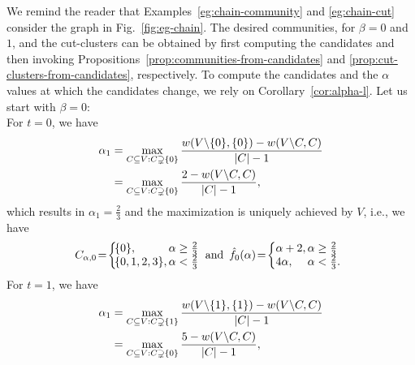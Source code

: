 We remind the reader that Examples~\ref{eg:chain-community} and \ref{eg:chain-cut} consider the graph in Fig.~\ref{fig:eg-chain}.
The desired communities, for $\beta = 0$ and $1$, and the cut-clusters can be obtained by first computing the
candidates and then invoking Propositions~\ref{prop:communities-from-candidates}
and \ref{prop:cut-clusters-from-candidates}, respectively.
To compute the candidates and the $\alpha$ values at which the candidates change, we rely on
Corollary~\ref{cor:alpha-l}.
Let us start with $\beta = 0$:
\\
For $t = 0$, we have
\begin{align*}
	\alpha_1
		&=
		\max_{C\subseteq V:C\supsetneq \{0\}} \frac{w(V\backslash \{0\},\{0\}) - w(V\backslash C,C)}{|C|-1} \\
		& = 
		\max_{C\subseteq V:C\supsetneq \{0\}} \frac{2 - w(V\backslash C,C)}{|C|-1},
\end{align*}
which results in $\alpha_1 = \frac{2}{3}$ and the maximization is uniquely achieved by $V$, i.e., we
have
\begin{align*}
	\begin{array}{lll}
	C_{\alpha,0} \! = \! \left\{
	\!\!
		\begin{array}{ll}
		\!\!
			\Set{0}, \!\! & \!\!\! \alpha \geq  \frac{2}{3}
			\\
			\!\!
			\Set{0,1,2,3}, \!\! & \!\!\! \alpha < \frac{2}{3}
		\end{array}
		\!\!\!
		\right.
		& 
		\!\!\!
		\text{and}
		\!\!\!
		&
	\hat{f}_{0}(\alpha) \! = \! \left\{
		\begin{array}{ll}
			\!\!\! \alpha + 2, \!\! &\!\!\!  \alpha \geq \frac{2}{3}
			\\
			\!\!\! 4\alpha, \!\! &\!\!\! \alpha < \frac{2}{3}
			.
		\end{array}
		\right.
	\end{array}
\end{align*}
%
For $t = 1$, we have
\begin{align*}
	\alpha_1
		&=
		\max_{C\subseteq V:C\supsetneq \{1\}} \frac{w(V\backslash \{1\},\{1\}) - w(V\backslash C,C)}{|C|-1} \\
		& = 
		\max_{C\subseteq V:C\supsetneq \{0\}} \frac{5 - w(V\backslash C,C)}{|C|-1},
\end{align*}
